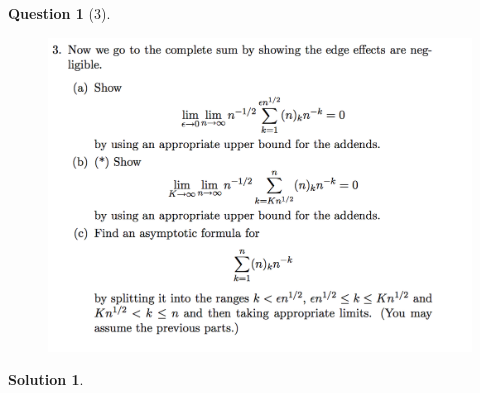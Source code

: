 \documentclass{article} %
\theoremstyle{quest}
\newtheorem*{question}{Question}
\newtheorem*{solution}{Solution}
\begin{document}
\newpage

\begin{question}[3]
\hfill
\begin{figure}[h!]
  \centering
    \includegraphics[width=1\textwidth]{PM-2-3.png}
\end{figure}
\end{question}
\begin{solution}
\end{solution}

\newpage
\end{document}
